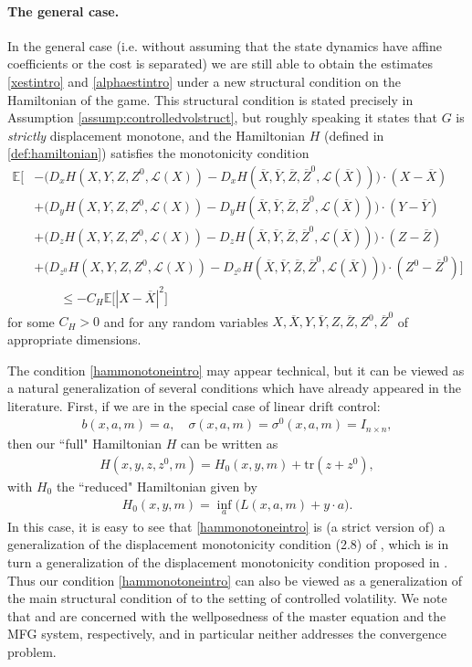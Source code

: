 \documentclass[11pt,reqno]{amsart}
\numberwithin{equation}{section}
\theoremstyle{definition}
\def\E{{\mathbb E}}
\def\tr{{\mathrm{tr}}}
\newcommand{\sL}{\mathcal{L}}
\newcommand{\ov}{\overline}
\def \E{\mathbb{E}}
\begin{document}
\paragraph{\textbf{The general case}.}
In the general case (i.e. without assuming that the state dynamics have affine coefficients or the cost is separated) we are still able to obtain the estimates \eqref{xestintro} and \eqref{alphaestintro} under a new structural condition on the Hamiltonian of the game. This
structural condition is stated precisely in Assumption \ref{assump:controlledvolstruct}, but roughly speaking it states that $G$ is \textit{strictly} displacement monotone, and the Hamiltonian $H$ (defined in \eqref{def:hamiltonian}) satisfies the monotonicity condition 
\begin{align} \label{hammonotoneintro}
  \E\bigg[ &- \big(D_x H (X,Y,Z,Z^0,\sL(X)) - D_x H(\ov{X},\ov{Y},\ov{Z},\ov{Z}^0, \sL(\ov{X})) \big) \cdot (X - \ov{X})  \nonumber 
  \\  &+ \big(D_y H(X,Y,Z,Z^0,\sL(X)) - D_y H(\ov{X},\ov{Y},\ov{Z},\ov{Z}^0, \sL(\ov{X})) \big) \cdot (Y - \ov{Y}) \nonumber \\ &+ \big(D_z H (X,Y,Z,Z^0,\sL(X)) - D_z H(\ov{X},\ov{Y},\ov{Z},\ov{Z}^0, \sL(\ov{X})) \big) \cdot (Z - \ov{Z}) \nonumber 
  \\ & + \big(D_{z^0} H(X,Y,Z,Z^0,\sL(X)) - D_{z^0} H(\ov{X},\ov{Y},\ov{Z},\ov{Z}^0, \sL(\ov{X})) \big) \cdot (Z^0 - \ov{Z}^0) \bigg] \nonumber \\
& \quad \quad \leq - C_H \E\big[|X - \ov{X}|^2\big]
\end{align}
for some $C_H > 0$ and for any random variables $X, \ov{X}, Y, \ov{Y}, Z, \ov{Z}, Z^0, \ov{Z}^0$ of appropriate dimensions. 

The condition \eqref{hammonotoneintro} may appear technical, but it can be viewed as a natural generalization of several conditions which have already appeared in the literature. First, if we are in the special case of linear drift control: 
\begin{align*}
    b(x,a,m) = a, \quad \sigma(x,a,m) = \sigma^0(x,a,m) = I_{n \times n}, 
\end{align*}
then our ``full" Hamiltonian $H$ can be written as 
\begin{align*}
    H(x,y,z,z^0,m) = H_0(x,y,m) + \tr(z + z^0), 
\end{align*}
with $H_0$ the ``reduced" Hamiltonian given by 
\begin{align*}
    H_0(x,y,m) = \inf_{a} \Big(L(x,a,m) + y \cdot a \Big).
\end{align*}
In this case, it is easy to see that \eqref{hammonotoneintro} is (a strict version of) a generalization of the displacement monotonicity condition (2.8) of \cite{Mes-Mou21}, which is in turn a generalization of the displacement monotonicity condition proposed in \cite[Definition 3.4]{Gang-Mes-Mou-Zhang22}. Thus our condition \eqref{hammonotoneintro} can also be viewed as a generalization of the main structural condition of \cite{Gang-Mes-Mou-Zhang22} to the setting of controlled volatility. We note that \cite{Gang-Mes-Mou-Zhang22} and \cite{Mes-Mou21} are concerned with the wellposedness of the master equation and the MFG system, respectively, and in particular neither addresses the convergence problem.
\end{document}
